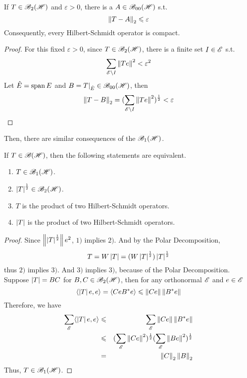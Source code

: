 \begin{cor}
	If $T \in \mathscr{B}_{2}\mathscr{(H)}$ and $\varepsilon > 0$, there is a $A \in \mathscr{B}_{00}\mathscr{(H)}$ s.t.
	\begin{equation*}
		\left\lVert T-A\right\lVert_2 \leqslant \varepsilon
	\end{equation*}
	Consequently, every Hilbert-Schmidt operator is compact.
\end{cor}
\begin{proof}
	For this fixed $\varepsilon > 0$, since $T \in \mathscr{B}_{2}\mathscr{(H)}$, there is a finite set $I \in \mathscr{E}$ s.t.
	\begin{equation*}
		\sum_{\mathscr{E} \backslash I} \left\lVert Te\right\lVert^2 < \varepsilon^2
	\end{equation*}
	Let $\hat{E} = \operatorname{span}{E}$ and $B = T|_{\hat{E}} \in \mathscr{B}_{00}\mathscr{(H)}$, then
	\begin{equation*}
		\left\lVert T-B\right\lVert_2 = (\sum_{\mathscr{E} \backslash I} \left\lVert Te\right\lVert^2)^{\frac{1}{2}} < \varepsilon \qedhere
	\end{equation*}
\end{proof}

Then, there are similar consequences of the $\mathscr{B}_{1}\mathscr{(H)}$.

\begin{prop}
	If $T \in \mathscr{B(H)}$, then the following statements are equivalent.
	\begin{enumerate}[label=\arabic*)]
		\item $T \in \mathscr{B}_{1}\mathscr{(H)}$.
		\item $\left\lvert T\right\lvert^{\frac{1}{2}} \in \mathscr{B}_{2}\mathscr{(H)}$.
		\item $T$ is the product of two Hilbert-Schmidt operators.
		\item $\left\lvert T\right\lvert$ is the product of two Hilbert-Schmidt operators.
	\end{enumerate}
\end{prop}
\begin{proof}
	Since $\left\lVert\left\lvert T\right\lvert^{\frac{1}{2}}\right\lVert{e}^2$, $1)$ implies $2)$. And by the Polar Decomposition,
	\begin{equation*}
		T = W \left\lvert T\right\lvert = (W \left\lvert T\right\lvert^{\frac{1}{2}})\left\lvert T\right\lvert^{\frac{1}{2}}
	\end{equation*}
	thus $2)$ implies $3)$. And $3)$ implies $3)$, because of the Polar Decomposition. \\
	Suppose $\left\lvert T\right\lvert = BC$ for $B,C \in \mathscr{B}_{2}\mathscr{(H)}$, then for any orthonormal $\mathscr{E}$ and $e \in \mathscr{E}$
	\begin{equation*}
		\langle \left\lvert T\right\lvert e, e \rangle = \langle Ce B^{*}e \rangle \leqslant \left\lVert Ce\right\lVert\left\lVert B^{*}e\right\lVert
	\end{equation*}
	Therefore, we have 
	\begin{eqnarray*}
		\sum_{\mathscr{E}} \langle \left\lvert T\right\lvert e, e \rangle &\leqslant& \sum_{\mathscr{E}} \left\lVert Ce\right\lVert\left\lVert B^{*}e\right\lVert \\
		&\leqslant& (\sum_{\mathscr{E}} \left\lVert Ce\right\lVert^2)^{\frac{1}{2}} (\sum_{\mathscr{E}} \left\lVert Be\right\lVert^2)^{\frac{1}{2}} \\ 
		&=& \left\lVert C\right\lVert_2 \left\lVert B\right\lVert_2
	\end{eqnarray*}
	Thus, $T \in \mathscr{B}_{1}\mathscr{(H)}$.
\end{proof}

